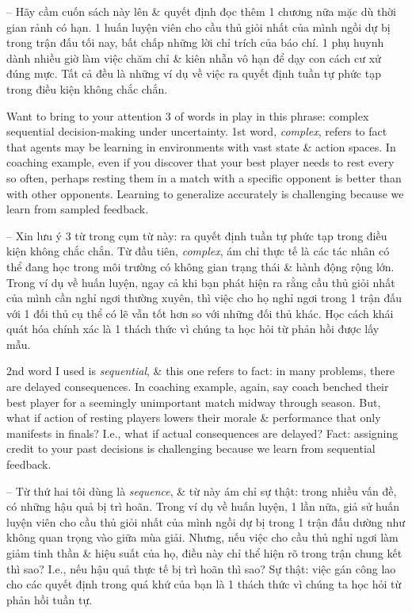 \documentclass{article}
\begin{document}
\begin{itemize}
    -- Hãy cầm cuốn sách này lên \& quyết định đọc thêm 1 chương nữa mặc dù thời gian rảnh có hạn. 1 huấn luyện viên cho cầu thủ giỏi nhất của mình ngồi dự bị trong trận đấu tối nay, bất chấp những lời chỉ trích của báo chí. 1 phụ huynh dành nhiều giờ làm việc chăm chỉ \& kiên nhẫn vô hạn để dạy con cách cư xử đúng mực. Tất cả đều là những ví dụ về việc ra quyết định tuần tự phức tạp trong điều kiện không chắc chắn.

    Want to bring to your attention 3 of words in play in this phrase: complex sequential decision-making under uncertainty. 1st word, {\it complex}, refers to fact that agents may be learning in environments with vast state \& action spaces. In coaching example, even if you discover that your best player needs to rest every so often, perhaps resting them in a match with a specific opponent is better than with other opponents. Learning to generalize accurately is challenging because we learn from sampled feedback.

    -- Xin lưu ý 3 từ trong cụm từ này: ra quyết định tuần tự phức tạp trong điều kiện không chắc chắn. Từ đầu tiên, {\it complex}, ám chỉ thực tế là các tác nhân có thể đang học trong môi trường có không gian trạng thái \& hành động rộng lớn. Trong ví dụ về huấn luyện, ngay cả khi bạn phát hiện ra rằng cầu thủ giỏi nhất của mình cần nghỉ ngơi thường xuyên, thì việc cho họ nghỉ ngơi trong 1 trận đấu với 1 đối thủ cụ thể có lẽ vẫn tốt hơn so với những đối thủ khác. Học cách khái quát hóa chính xác là 1 thách thức vì chúng ta học hỏi từ phản hồi được lấy mẫu.

    2nd word I used is {\it sequential}, \& this one refers to fact: in many problems, there are delayed consequences. In coaching example, again, say coach benched their best player for a seemingly unimportant match midway through season. But, what if action of resting players lowers their morale \& performance that only manifests in finals? I.e., what if actual consequences are delayed? Fact: assigning credit to your past decisions is challenging because we learn from sequential feedback.

    -- Từ thứ hai tôi dùng là {\it sequence}, \& từ này ám chỉ sự thật: trong nhiều vấn đề, có những hậu quả bị trì hoãn. Trong ví dụ về huấn luyện, 1 lần nữa, giả sử huấn luyện viên cho cầu thủ giỏi nhất của mình ngồi dự bị trong 1 trận đấu dường như không quan trọng vào giữa mùa giải. Nhưng, nếu việc cho cầu thủ nghỉ ngơi làm giảm tinh thần \& hiệu suất của họ, điều này chỉ thể hiện rõ trong trận chung kết thì sao? I.e., nếu hậu quả thực tế bị trì hoãn thì sao? Sự thật: việc gán công lao cho các quyết định trong quá khứ của bạn là 1 thách thức vì chúng ta học hỏi từ phản hồi tuần tự.


\end{itemize}
\end{document}
